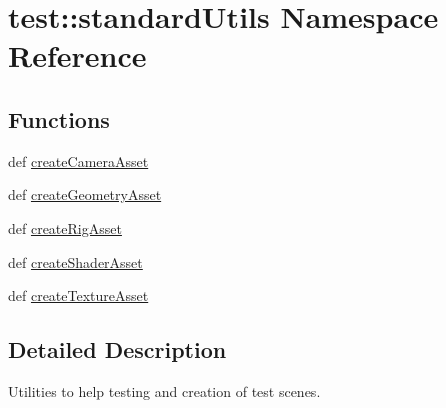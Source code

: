 \hypertarget{namespacetest_1_1standardUtils}{\section{test\-:\-:standard\-Utils \-Namespace \-Reference}
\label{de/da1/namespacetest_1_1standardUtils}
}
\subsection*{\-Functions}
\begin{DoxyCompactItemize}
\item 
def \hyperlink{namespacetest_1_1standardUtils_a2f86505f17d94f9c7fbdab1e40ed44e8}{create\-Camera\-Asset}
\item 
def \hyperlink{namespacetest_1_1standardUtils_ace1040628eb0cea4f739afe09cfb3faa}{create\-Geometry\-Asset}
\item 
def \hyperlink{namespacetest_1_1standardUtils_a51ba946c03ebfcddb89184dc9ecae7c0}{create\-Rig\-Asset}
\item 
def \hyperlink{namespacetest_1_1standardUtils_a50bcf678a7e7fa70a24002909ddbc067}{create\-Shader\-Asset}
\item 
def \hyperlink{namespacetest_1_1standardUtils_a311e365eb047fe9162c3813a0b1d06c5}{create\-Texture\-Asset}
\end{DoxyCompactItemize}


\subsection{\-Detailed \-Description}
\begin{DoxyVerb}
Utilities to help testing and creation of test scenes.
\end{DoxyVerb}
 

